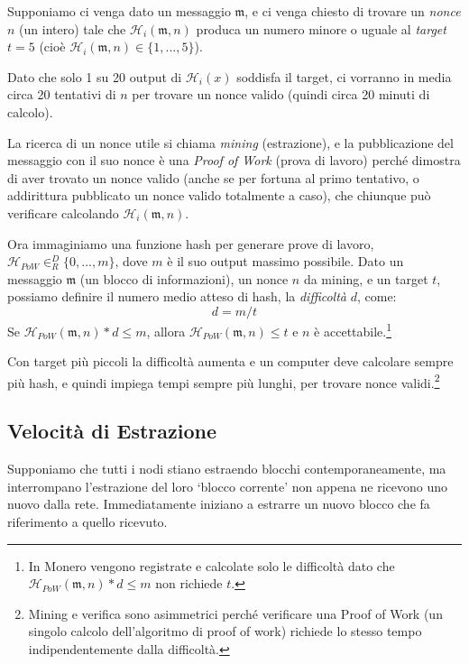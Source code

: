 Supponiamo ci venga dato un messaggio $\mathfrak{m}$, e ci venga chiesto di trovare un \emph{nonce} $n$ (un intero) tale che $\mathcal{H}_i(\mathfrak{m},n)$ produca un numero minore o uguale al {\em target} $t = 5$ (cioè $\mathcal{H}_i(\mathfrak{m},n) \in \{1,...,5\}$).

Dato che solo 1 su 20 output di $\mathcal{H}_i(x)$ soddisfa il target, ci vorranno in media circa 20 tentativi di $n$ per trovare un nonce valido (quindi circa 20 minuti di calcolo).

La ricerca di un nonce utile si chiama {\em mining} (estrazione), e la pubblicazione del messaggio con il suo nonce è una {\em Proof of Work} (prova di lavoro) perché dimostra di aver trovato un nonce valido (anche se per fortuna al primo tentativo, o addirittura pubblicato un nonce valido totalmente a caso), che chiunque può verificare calcolando $\mathcal{H}_i(\mathfrak{m},n)$.

Ora immaginiamo una funzione hash per generare prove di lavoro, $\mathcal{H}_{PoW} \in^D_R \{0,...,m\}$, dove $m$ è il suo output massimo possibile. Dato un messaggio $\mathfrak{m}$ (un blocco di informazioni), un nonce $n$ da mining, e un target $t$, possiamo definire il numero medio atteso di hash, la {\em difficoltà} $d$, come: \[ d = m/t \] Se $\mathcal{H}_{PoW}(\mathfrak{m},n)*d \leq m$, allora $\mathcal{H}_{PoW}(\mathfrak{m},n) \leq t$ e $n$ è accettabile.\footnote{In Monero vengono registrate e calcolate solo le difficoltà dato che $\mathcal{H}_{PoW}(\mathfrak{m},n)*d \leq m$ non richiede $t$.} 

Con target più piccoli la difficoltà aumenta e un computer deve calcolare sempre più hash, e quindi impiega tempi sempre più lunghi, per trovare nonce validi.\footnote{Mining e verifica sono asimmetrici perché verificare una Proof of Work (un singolo calcolo dell’algoritmo di proof of work) richiede lo stesso tempo indipendentemente dalla difficoltà.}


\subsection{Velocità di Estrazione}

Supponiamo che tutti i nodi stiano estraendo blocchi contemporaneamente, ma interrompano l'estrazione del loro `blocco corrente’ non appena ne ricevono uno nuovo dalla rete. Immediatamente iniziano a estrarre un nuovo blocco che fa riferimento a quello ricevuto.

